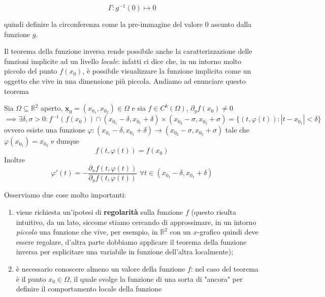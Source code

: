 $$
\Gamma : g^{-1}(0) \mapsto 0
$$

quindi definire la circonferenza come la pre-immagine del valore $0$ assunto dalla funzione $g$. 

Il teorema della funzione inversa rende possibile anche la caratterizzazione delle funzioni implicite ad un livello \emph{locale}: infatti ci dice che, in un intorno molto piccolo del punto $f(x_0)$, è possibile visualizzare la funzione implicita come un oggetto che vive in una dimensione più piccola. Andiamo ad enunciare questo teorema

\vspace{0.5cm}
\begin{theorem}[\textcolor{blue}{Della funzione implicita rispetto a $x$}]
Sia $\Omega \subseteq \mathbb{R}^2$ aperto, $\bm{\underline{x}}_0 = (x_{0_1}, x_{0_2}) \in \Omega$ e sia $f \in C^k (\Omega)$, $\partial_y f(x_0) \neq 0$
$$\implies \exists \delta, \sigma > 0 : f^{-1}(f(x_0)) \cap (x_{0_1}-\delta, x_{0_1}+\delta) \times (x_{0_2} - \sigma, x_{0_2}+\sigma) = \{(t, \varphi(t)) : |t-x_{0_1}| < \delta \}$$
ovvero esiste una funzione $\varphi: (x_{0_1} - \delta, x_{0_1} + \delta) \to (x_{0_2}-\sigma, x_{0_2} + \sigma)$ tale che $\varphi(x_{0_1}) = x_{0_2}$ e dunque
$$
f(t, \varphi(t)) = f(x_0)
$$
Inoltre
$$
\varphi'(t)=-\frac{\partial_x f(t, \varphi(t))}{\partial_y f(t, \varphi(t))} \, \, \forall t \in (x_{0_1} - \delta, x_{0_1} + \delta)
$$
\end{theorem}

\hspace{1cm} 

Osserviamo due cose molto importanti:

\begin{enumerate}[label=\protect\circled{\arabic*}]
	\item viene richiesta un'ipotesi di \textbf{regolarità} sulla funzione $f$ (questo risulta intuitivo, da un lato, siccome stiamo cercando di approssimare, in un intorno \emph{piccolo} una funzione che vive, per esempio, in $\mathbb{R}^2$ con un $x$-grafico quindi deve essere regolare, d'altra parte dobbiamo applicare il teorema della funzione inversa per esplicitare una variabile in funzione dell'altra localmente);
	\item è necessario conoscere almeno un valore della funzione $f$: nel caso del teorema è il punto $x_0 \in \Omega$, il quale svolge la funzione di una sorta di "ancora" per definire il comportamento locale della funzione
\end{enumerate}

